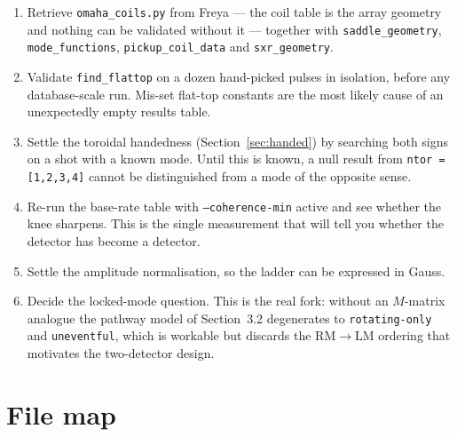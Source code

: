 \documentclass[11pt,a4paper]{article}
\newcommand{\code}[1]{\texttt{\small #1}}
\begin{document}
\begin{enumerate}[leftmargin=2em]
\item Retrieve \code{omaha\_coils.py} from Freya --- the coil table is the array geometry
and nothing can be validated without it --- together with \code{saddle\_geometry},
\code{mode\_functions}, \code{pickup\_coil\_data} and \code{sxr\_geometry}.
\item Validate \code{find\_flattop} on a dozen hand-picked pulses in isolation, before any
database-scale run. Mis-set flat-top constants are the most likely cause of an
unexpectedly empty results table.
\item Settle the toroidal handedness (Section~\ref{sec:handed}) by searching both signs on
a shot with a known mode. Until this is known, a null result from
\code{ntor = [1,2,3,4]} cannot be distinguished from a mode of the opposite sense.
\item Re-run the base-rate table with \code{--coherence-min} active and see whether the
knee sharpens. This is the single measurement that will tell you whether the detector has
become a detector.
\item Settle the amplitude normalisation, so the ladder can be expressed in Gauss.
\item Decide the locked-mode question. This is the real fork: without an $M$-matrix
analogue the pathway model of Section~3.2 degenerates to \code{rotating-only} and
\code{uneventful}, which is workable but discards the RM$\to$LM ordering that motivates the
two-detector design.
\end{enumerate}

\section{File map}
\end{document}
